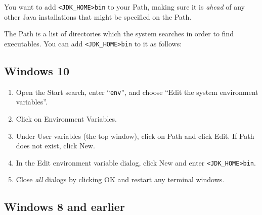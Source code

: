 You want to add {\tt <JDK\_HOME>\SEP bin} to your Path, making
sure it is {\it ahead} of any other Java installations that might be specified
on the Path. 

The Path is a list of directories which the system searches in
order to find executables. You can add {\tt <JDK\_HOME>\BKS bin} 
to it as follows:

\subsection*{Windows 10}

\begin{enumerate}

\item Open the {\sf Start} search, enter ``{\tt env}'', and choose
{\sf ``Edit the system environment variables''}.

\item Click on {\sf Environment Variables}.

\item Under {\sf User variables} (the top window), click on {\sf Path}
and click {\sf Edit}. If {\sf Path} does not exist, click {\sf New}.

\item In the {\sf Edit environment variable} dialog, click {\sf New}
and enter {\tt<JDK\_HOME>\BKS bin}.

\item Close {\it all} dialogs by clicking {\sf OK} and restart 
any terminal windows.

\end{enumerate}

\subsection*{Windows 8 and earlier}

